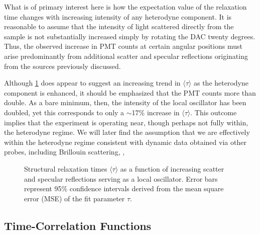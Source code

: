 What is of primary interest here is how the expectation value of the relaxation time changes with increasing intensity of any heterodyne component. It is reasonable to assume that the intensity of light scattered directly from the sample is not substantially increased simply by rotating the DAC twenty degrees. Thus, the observed increase in PMT counts at certain angular positions must arise predominantly from additional scatter and specular reflections originating from the sources previously discussed.  

Although \fig \ref{figure:HetHomo} does appear to suggest an increasing trend in $\langle \tau \rangle$ as the heterodyne component is enhanced, it should be emphasized that the PMT counts more than double. As a bare minimum, then, the intensity of the local oscillator has been doubled, yet this corresponds to only a $\sim$17\% increase in $\langle \tau \rangle$. This outcome implies that the experiment is operating near, though perhaps not fully within, the heterodyne regime. We will later find the assumption that we are effectively within the heterodyne regime consistent with dynamic data obtained via other probes, including Brillouin scattering, \tgp, \etc

\begin{figure}[!htbp]
	\centering
	\caption{Structural relaxation times $\langle \tau \rangle$ as a function of increasing scatter and specular reflections serving as a local oscillator. Error bars represent 95\% confidence intervals derived from the mean square error (MSE) of the fit parameter $\tau$.}
	\label{figure:HetHomo}
\end{figure}

\subsection{Time-Correlation Functions}
\label{sec:TimeCorrelation}

